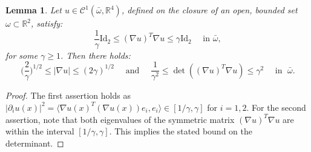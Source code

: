 \documentclass[reqno,twoside,11pt]{amsart}
\newcommand{\sym}{\mathrm{sym}}
\newcommand{\Id}{\mathrm{Id}}
\newcommand{\R}{\mathbb{R}}
\numberwithin{equation}{section}
\theoremstyle{plain}
\newtheorem{lemma}[theorem]{Lemma}
\theoremstyle{definition}
\begin{document}
\begin{lemma}\label{lem_det}
Let $u\in\mathcal{C}^1(\bar\omega,\R^4)$, defined on the closure of an
open, bounded set $\omega\subset\R^2$, satisfy:
\begin{equation}\label{immers_gamma}
\frac{1}{\gamma}\Id_2\leq (\nabla u)^T\nabla u \leq \gamma\Id_2
\quad\mbox{ in } \bar\omega,
\end{equation}
 for some $\gamma\geq 1$. Then there holds:
$$\big(\frac{2}{\gamma}\big)^{1/2} \leq |\nabla u| \leq (2\gamma)^{1/2} \quad\mbox{ and }\quad 
\frac{1}{\gamma^2}\leq\det((\nabla u)^T\nabla u)\leq \gamma^2
\quad \mbox{ in } \;\bar\omega.$$
\end{lemma}
\begin{proof}
The first assertion holds as $|\partial_iu(x)|^2=\langle \nabla
u(x)^T(\nabla u(x)) e_i, e_i\rangle \in [1/\gamma,\gamma]$ for $i=1,2$. For the
second assertion, note that both eigenvalues
of the symmetric matrix $(\nabla u)^T\nabla u$ are within the
interval $[1/\gamma, \gamma]$. This implies the stated bound on the determinant.

\end{proof}

\medskip
\end{document}
